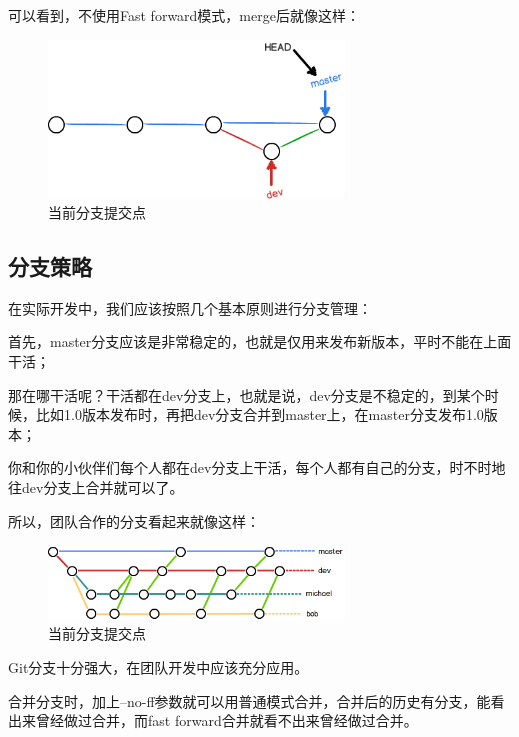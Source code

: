 可以看到，不使用Fast forward模式，merge后就像这样：

\begin{figure}[h]
  \centering
  \includegraphics[width=0.7\textwidth]{img/git-no-ff-mode.png}
  \caption{当前分支提交点}
  \label{fig:git-no-ff-mode}
\end{figure}

\subsection{分支策略}

在实际开发中，我们应该按照几个基本原则进行分支管理：

首先，master分支应该是非常稳定的，也就是仅用来发布新版本，平时不能在上面干活；

那在哪干活呢？干活都在dev分支上，也就是说，dev分支是不稳定的，到某个时候，比如1.0版本发布时，再把dev分支合并到master上，在master分支发布1.0版本；

你和你的小伙伴们每个人都在dev分支上干活，每个人都有自己的分支，时不时地往dev分支上合并就可以了。

所以，团队合作的分支看起来就像这样：


\begin{figure}[h]
  \centering
  \includegraphics[width=0.7\textwidth]{img/git-br-policy.png}
  \caption{当前分支提交点}
  \label{fig:git-br-policy}
\end{figure}

\begin{tcolorbox}

Git分支十分强大，在团队开发中应该充分应用。

合并分支时，加上--no-ff参数就可以用普通模式合并，合并后的历史有分支，能看出来曾经做过合并，而fast forward合并就看不出来曾经做过合并。
\end{tcolorbox}

